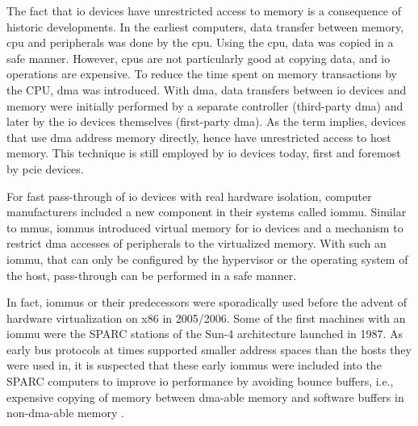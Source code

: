 The fact that \ac{io} devices have unrestricted access to memory is a
consequence of historic developments. In the earliest computers, data transfer
between memory, \acs{cpu} and peripherals was done by the \ac{cpu}. Using the
\ac{cpu}, data was copied in a safe manner. However, \acp{cpu} are not
particularly good at copying data, and \ac{io} operations are expensive. To
reduce the time spent on memory transactions by the CPU, \ac{dma} was
introduced. With \ac{dma}, data transfers between \ac{io} devices and memory
were initially performed by a separate controller (third-party \ac{dma}) and
later by the \ac{io} devices themselves (first-party \ac{dma}). As the term
implies, devices that use \ac{dma} address memory directly, hence have
unrestricted access to host memory. This technique is still employed by \ac{io}
devices today, first and foremost by \acs{pcie} devices.

For fast pass-through of \ac{io} devices with real hardware isolation, computer
manufacturers included a new component in their systems called \acf{iommu}.
Similar to \acp{mmu}, \acp{iommu} introduced virtual memory for \ac{io} devices
and a mechanism to restrict \ac{dma} accesses of peripherals to the virtualized
memory. With such an \ac{iommu}, that can only be configured by the hypervisor
or the operating system of the host, pass-through can be performed in a safe
manner.

In fact, \acp{iommu} or their predecessors were sporadically used before the
advent of hardware virtualization on x86 in 2005/2006. Some of the first
machines with an \ac{iommu} were the SPARC stations of the Sun-4 architecture
launched in 1987.  As early bus protocols at times supported smaller address
spaces than the hosts they were used in, it is suspected that these early
\acp{iommu} were included into the SPARC computers to improve \ac{io}
performance by avoiding bounce buffers, i.e., expensive copying of memory
between \ac{dma}-able memory and software buffers in non-\ac{dma}-able memory
\cite[pp.~28~ff.]{rothwell2018exploitation}.


